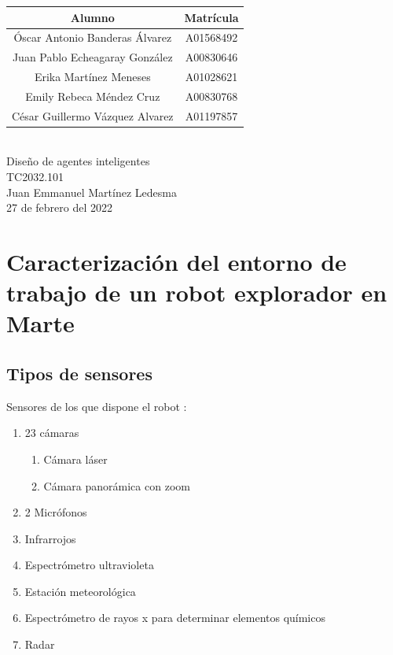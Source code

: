 \documentclass{article}
\begin{document}
\begin{titlepage}
\begin{center}
        \begin{tabular}{|| c | c ||}
            \hline
            Alumno & Matrícula \\
            \hline
            Óscar Antonio Banderas Álvarez  & A01568492 \\
            \hline
            Juan Pablo Echeagaray González & A00830646 \\
            \hline
            Erika Martínez Meneses & A01028621 \\
            \hline
            Emily Rebeca Méndez Cruz & A00830768 \\
            \hline
            César Guillermo Vázquez Alvarez & A01197857 \\
            \hline
        \end{tabular} \\
        \vspace{0.7cm}
        Diseño de agentes inteligentes\\ %
        \vspace{0.2cm}
        TC2032.101\\ %
        \vspace{0.2cm}
        Juan Emmanuel Martínez Ledesma \\ %
        \vspace{0.7cm}
        27 de febrero del 2022 \\ %
        \end{center}
    \end{titlepage}

    \section{Caracterización del entorno de trabajo de un robot explorador en Marte}
        \subsection{Tipos de sensores}
        Sensores de los que dispone el robot \parencite{bbc-news-mundo-2021}:
            \begin{enumerate}
                \item 23 cámaras
                \begin{enumerate}
                    \item Cámara láser
                    \item Cámara panorámica con zoom
                \end{enumerate}
                \item 2 Micrófonos
                \item Infrarrojos
                \item Espectrómetro ultravioleta
                \item Estación meteorológica
                \item Espectrómetro de rayos x para determinar elementos químicos
                \item Radar
            \end{enumerate}
\end{document}
